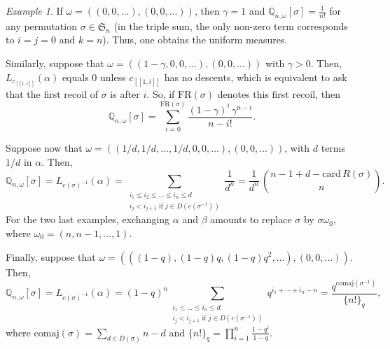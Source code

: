 \documentclass[smallextended,nospthms]{svjour3}
\theoremstyle{remark}
\newtheorem*{example}{Example}
\newcommand{\sym}{\mathfrak{S}}
\newcommand{\card}{\mathrm{card}\,}
\newcommand{\qproba}{\mathbb{Q}}
\newcommand{\lle}{\left[\!\left[}
\newcommand{\rre}{\right]\!\right]}
\begin{document}
\begin{example}
If $\omega=((0,0,\ldots),(0,0,\ldots))$, then $\gamma =1$ and $\qproba_{n,\omega}[\sigma]=\frac{1}{n!}$ for any permutation $\sigma \in \sym_{n}$ (in the triple sum, the only non-zero term corresponds to $i=j=0$ and $k=n$). Thus, one obtains the uniform measures.\bigskip

\noindent Similarly, suppose that $\omega=((1-\gamma,0,0,\ldots),(0,0,\ldots))$ with $\gamma >0$. Then, $L_{c_{\lle 1,i\rre}}(\alpha)$ equals $0$ unless $c_{\lle 1,i\rre}$ has no descents, which is equivalent to ask that the first recoil of $\sigma$ is after $i$. So, if $\mathrm{FR}(\sigma)$ denotes this first recoil, then
$$\mathbb{Q}_{n,\omega}[\sigma]=\sum_{i=0}^{\mathrm{FR}(\sigma)}\frac{(1-\gamma)^{i}\,\gamma^{n-i}}{n-i!}.$$\bigskip

\noindent Suppose now that $\omega=((1/d,1/d,\ldots,1/d,0,0,\ldots),(0,0,\ldots))$, with $d$ terms $1/d$ in $\alpha$. Then, 
$$\qproba_{n,\omega}[\sigma]=L_{c(\sigma)^{-1}}(\alpha)=\!\!\!\!\sum_{\substack{i_{1}\leq i_{2} \leq \ldots\leq i_{n} \leq d\\
i_{j}<i_{j+1}\text{ if }j \in D(c(\sigma^{-1}))}}\!\! \frac{1}{d^{n}}=\frac{1}{d^{n}}\,\binom{n-1+d-\card R(\sigma)}{n}.$$
For the two last examples, exchanging $\alpha$ and $\beta$ amounts to replace $\sigma$ by $\sigma\omega_{0}$, where $\omega_{0}=(n,n-1,\ldots,1)$.\bigskip

\noindent  Finally, suppose that $\omega=(((1-q),(1-q)q,(1-q)q^{2},\ldots),(0,0,\ldots))$. Then,
$$\qproba_{n,\omega}[\sigma]=L_{c(\sigma)^{-1}}(\alpha)=(1-q)^{n}\!\!\!\!\!\!\sum_{\substack{i_{1} \leq \ldots\leq i_{n} \leq d\\
i_{j}<i_{j+1}\text{ if }j \in D(c(\sigma^{-1}))}}\!\!\!\!\! q^{i_{1}+\cdots+i_{n}-n}=\frac{q^{\mathrm{comaj}(\sigma^{-1})}}{\{n!\}_{q}},$$
where $\mathrm{comaj}(\sigma)=\sum_{d \in D(\sigma)}n-d$ and $\{n!\}_{q}=\prod_{i=1}^{n }\frac{1-q^{i}}{1-q}.$
\end{example}
\end{document}
